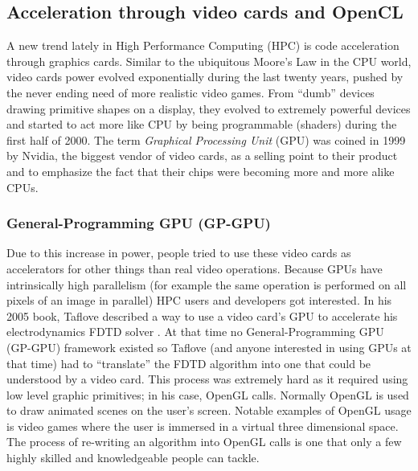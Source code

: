 \subsection{Acceleration through video cards and OpenCL}
\label{section:tools:opencl}

A new trend lately in High Performance Computing (HPC) is code acceleration
through graphics cards. Similar to the ubiquitous Moore's Law in the CPU world,
video cards power evolved exponentially during the last twenty years, pushed
by the never ending need of more realistic video games. From ``dumb'' devices
drawing primitive shapes on a display, they evolved to extremely powerful
devices and started to act more like CPU by being programmable (shaders) during
the first half of 2000. The term \textit{Graphical Processing Unit} (GPU) was
coined in 1999 by Nvidia, the biggest vendor of video cards, as a selling point
to their product and to emphasize the fact that their chips were becoming more
and more alike CPUs.

\subsubsection{General-Programming GPU (GP-GPU)}

Due to this increase in power, people tried to use these video cards as
accelerators for other things than real video operations. Because GPUs have
intrinsically high parallelism (for example the same operation is performed on
all pixels of an image in parallel) HPC users and developers got interested.
In his 2005 book, Taflove described a way to use a video card's GPU to
accelerate his electrodynamics FDTD solver \cite{Taflove2005}. At that time no
General-Programming GPU (GP-GPU) framework existed so Taflove (and anyone
interested in using GPUs at that time) had to ``translate'' the FDTD algorithm
into one that could be understood by a video card. This process was extremely
hard as it required using low level graphic primitives; in his case, OpenGL
calls. Normally OpenGL is used to draw animated scenes on the user's screen.
Notable examples of OpenGL usage is video games where the user is immersed in a
virtual three dimensional space. The process of re-writing an algorithm into
OpenGL calls is one that only a few highly skilled and knowledgeable people can
tackle.

